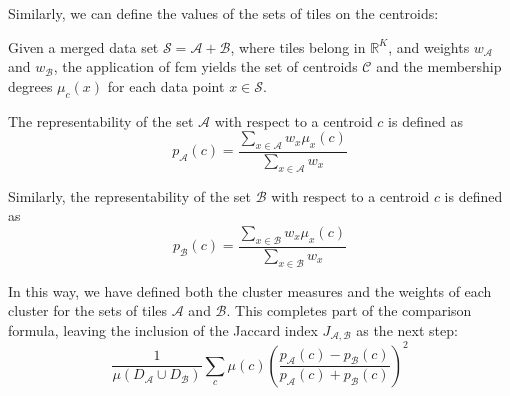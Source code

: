 \bigskip \noindent Similarly, we can define the values of the sets of tiles on the centroids:
\begin{toReview}
\begin{definition}
	\label{def:weightovercluster}
	Given a merged data set $\mathcal{S}=\mathcal{A}+\mathcal{B}$, where tiles belong in $\mathbb{R}^K$, and weights $w_\mathcal{A}$ and $w_\mathcal{B}$, the application of \gls{fcm} yields the set of centroids $\mathcal{C}$ and the membership degrees $\mu_c(x)$ for each data point $x\in\mathcal{S}$.

	\noindent The representability of the set $\mathcal{A}$ with respect to a centroid $c$ is defined as
	$$ p_\mathcal{A}(c) = \frac{\sum_{x\in\mathcal{A}} w_x\mu_x(c)}{\sum_{x\in\mathcal{A}} w_x} $$

	\noindent Similarly, the representability of the set $\mathcal{B}$ with respect to a centroid $c$ is defined as
	$$ p_\mathcal{B}(c) = \frac{\sum_{x\in\mathcal{B}} w_x\mu_x(c)}{\sum_{x\in\mathcal{B}} w_x} $$
\end{definition}

\noindent In this way, we have defined both the cluster measures and the weights of each cluster for the sets of tiles $\mathcal{A}$ and $\mathcal{B}$. This completes part of the comparison formula, leaving the inclusion of the Jaccard index $J_{\mathcal{A},\mathcal{B}}$ as the next step:
\[
	\frac{1}{\mu(D_\mathcal{A} \cup D_\mathcal{B})} \sum_c \mu(c) \left(\frac{p_\mathcal{A}(c) - p_\mathcal{B}(c)}{p_\mathcal{A}(c) + p_\mathcal{B}(c)}\right)^2
\]
\end{toReview}

